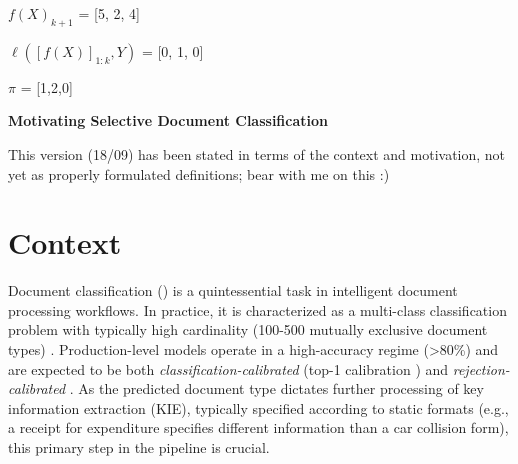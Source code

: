 

\begin{exmp}[simple]\hspace{0.1cm}
    
    $f(X)_{k+1}$ = [5, 2, 4]

    $\ell([f(X)]_{1:k}, Y)$ = [0, 1, 0] 

    $\pi$ = [1,2,0]

    
    
    
\end{exmp}


\newpage

\begin{center}{\noindent\Large\bf Motivating Selective Document Classification}\end{center}

\begin{uuredbox}
This version (18/09) has been stated in terms of the context and motivation, not yet as properly formulated definitions; bear with me on this :) 
\end{uuredbox}

\section{Context}

Document classification (\DC) is a quintessential task in intelligent document processing workflows. In practice, it is characterized as a multi-class classification problem with typically high cardinality (100-500 mutually exclusive document types) \cite{vanlandeghem2023document}. Production-level \DC{} models operate in a high-accuracy regime (>80\%) and are expected to be both \textit{classification-calibrated} \cite[Definition 1]{ni2019calibration} (top-1 calibration \cite{naeini2015obtaining,guo2017calibration,vaicenavicius2019evaluating}) and \textit{rejection-calibrated} \cite[Definition 2]{ni2019calibration}. As the predicted document type dictates further processing of key information extraction (KIE), typically specified according to static formats (e.g., a receipt for expenditure specifies different information than a car collision form), this primary step in the pipeline is crucial. 

